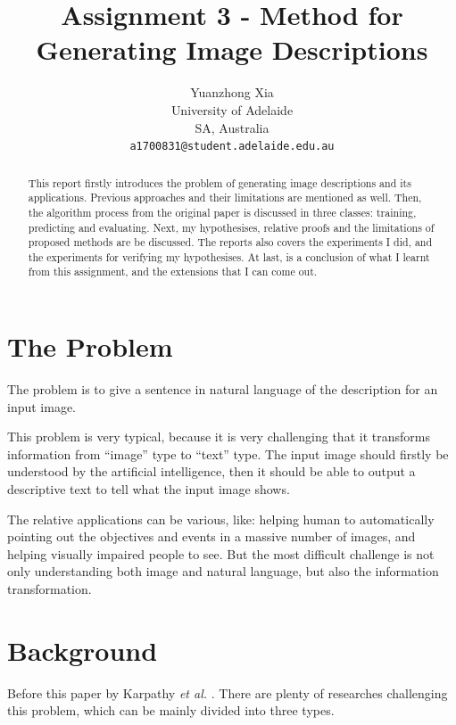 \documentclass[10pt,twocolumn,letterpaper]{article}
\begin{document}
\title{Assignment 3 - Method for Generating Image Descriptions}
\author{Yuanzhong Xia\\
University of Adelaide\\
SA, Australia\\
{\tt\small a1700831@student.adelaide.edu.au}
}
\maketitle

\begin{abstract}
This report firstly introduces the problem of generating image descriptions
and its applications. Previous approaches and their limitations are mentioned as well.
Then, the algorithm process from the original paper is discussed in three classes:
training, predicting and evaluating.
Next, my hypothesises, relative proofs and the limitations of proposed methods are be discussed.
The reports also covers the experiments I did, and the experiments for verifying my hypothesises.
At last, is a conclusion of what I learnt from this assignment, and the extensions that I can come out.
\end{abstract}

\section{The Problem}
The problem is to give a sentence in natural language of the description for an input image.

This problem is very typical, because it is very challenging that it transforms information from ``image'' type to ``text'' type.
The input image should firstly be understood by the artificial intelligence,
then it should be able to output a descriptive text to tell what the input image shows.

The relative applications can be various, like: helping human to automatically pointing out the objectives and events in a massive number of images,
and helping visually impaired people to see. But the most difficult challenge is not only understanding both image and natural language,
but also the information transformation.


\section{Background}
Before this paper by Karpathy \textit{et al.} \cite{origin}. There are plenty of researches challenging this problem,
which can be mainly divided into three types.
\end{document}
